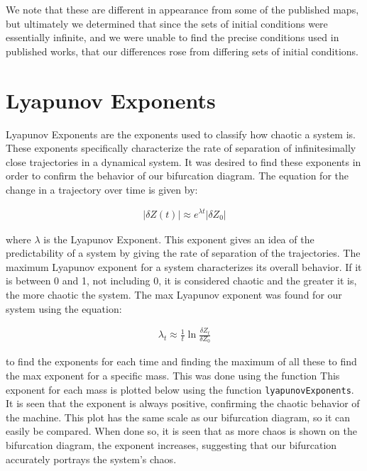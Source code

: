 \documentclass{article}
\begin{document}
We note that these are different in appearance from some of the published maps, but ultimately we determined that since the sets of initial conditions were essentially infinite, and we were unable to find the precise conditions used in published works, that our differences rose from differing sets of initial conditions.

\section*{Lyapunov Exponents}

Lyapunov Exponents are the exponents used to classify how chaotic a system is.  These exponents specifically characterize the rate of separation of infinitesimally close trajectories in a dynamical system.  It was desired to find these exponents in order to confirm the behavior of our bifurcation diagram. The equation for the change in a trajectory over time is given by:

\begin{gather*}
|\delta Z(t)| \approx e^{{\lambda t}}|\delta Z_{0}|
\end{gather*}

where  $\lambda$ is the Lyapunov Exponent. This exponent gives an idea of the predictability of a system by giving the rate of separation of the trajectories. The maximum Lyapunov exponent for a system characterizes its overall behavior. If it is between 0 and 1, not including 0, it is considered chaotic and the greater it is, the more chaotic the system. The max Lyapunov exponent was found for our system using the equation:

\begin{gather*}
\lambda_{t} \approx \frac{1}{t}\ln{\frac{\delta Z_{t}}{\delta Z_{0}}}
\end{gather*}

to find the exponents for each time and finding the maximum of all these to find the max exponent for a specific mass.  This was done using the function  This exponent for each mass is plotted below using the function \texttt{lyapunovExponents}.  It is seen that the exponent is always positive, confirming the chaotic behavior of the machine. This plot has the same scale as our bifurcation diagram, so it can easily be compared. When done so, it is seen that as more chaos is shown on the bifurcation diagram, the exponent increases, suggesting that our bifurcation accurately portrays the system's chaos. 
\end{document}
